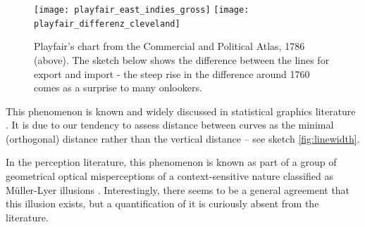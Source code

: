 \begin{figure}
\texttt{[image: playfair\_east\_indies\_gross]}
\texttt{[image: playfair\_differenz\_cleveland]}
\caption{Playfair's chart from the Commercial and Political Atlas, 1786 (above). The sketch below shows  the difference between the lines for export and import - the steep rise in the difference around 1760  comes as a surprise to many onlookers.  }
\label{playfair}
\end{figure}


This phenomenon  is known and widely discussed in statistical graphics literature \citep{wainer:2000, robbins:2005}. It  is due to our  tendency to assess distance between curves as the minimal (orthogonal) distance rather than the  vertical distance -- see sketch \ref{fig:linewidth}.


In the perception literature, this phenomenon is known as part of a group of geometrical optical misperceptions of a context-sensitive nature classified as M\"uller-Lyer illusions \citep{day:1991}. Interestingly, there seems to be a general agreement that this illusion exists, but a quantification of it is curiously absent from the literature. 




%
%




